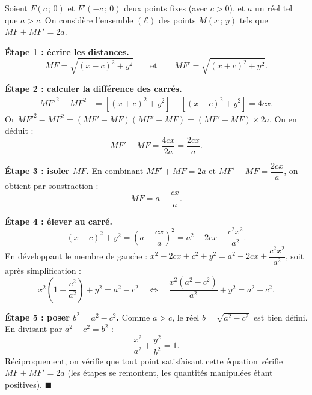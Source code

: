 \documentclass[11pt]{article}
\begin{document}
\begin{experience}[Démonstration guidée : de $MF + MF' = 2a$ à l'équation réduite]
Soient $F(c\,;\,0)$ et $F'(-c\,;\,0)$ deux points fixes (avec $c > 0$), et $a$ un réel tel que $a > c$. On considère l'ensemble $(\mathcal{E})$ des points $M(x\,;\,y)$ tels que $MF + MF' = 2a$.

\textbf{Étape 1 : écrire les distances.}
\[ MF = \sqrt{(x-c)^2 + y^2} \qquad \text{et} \qquad MF' = \sqrt{(x+c)^2 + y^2}. \]

\textbf{Étape 2 : calculer la différence des carrés.}
\begin{align*}
MF'^2 - MF^2 &= \left[(x+c)^2 + y^2\right] - \left[(x-c)^2 + y^2\right] = 4cx.
\end{align*}
Or $MF'^2 - MF^2 = (MF' - MF)(MF' + MF) = (MF' - MF) \times 2a$. On en déduit :
\[ MF' - MF = \frac{4cx}{2a} = \frac{2cx}{a}. \]

\textbf{Étape 3 : isoler $MF$.} En combinant $MF' + MF = 2a$ et $MF' - MF = \dfrac{2cx}{a}$, on obtient par soustraction :
\[ MF = a - \frac{cx}{a}. \]

\textbf{Étape 4 : élever au carré.}
\[ (x-c)^2 + y^2 = \left(a - \frac{cx}{a}\right)^2 = a^2 - 2cx + \frac{c^2 x^2}{a^2}. \]
En développant le membre de gauche : $x^2 - 2cx + c^2 + y^2 = a^2 - 2cx + \dfrac{c^2 x^2}{a^2}$, soit après simplification :
\[ x^2\left(1 - \frac{c^2}{a^2}\right) + y^2 = a^2 - c^2
\quad\Longleftrightarrow\quad
\frac{x^2 (a^2 - c^2)}{a^2} + y^2 = a^2 - c^2. \]

\textbf{Étape 5 : poser $b^2 = a^2 - c^2$.} Comme $a > c$, le réel $b = \sqrt{a^2 - c^2}$ est bien défini. En divisant par $a^2 - c^2 = b^2$ :
\[ \boxed{\frac{x^2}{a^2} + \frac{y^2}{b^2} = 1.} \]
Réciproquement, on vérifie que tout point satisfaisant cette équation vérifie $MF + MF' = 2a$ (les étapes se remontent, les quantités manipulées étant positives). \hfill$\blacksquare$
\end{experience}
\end{document}
